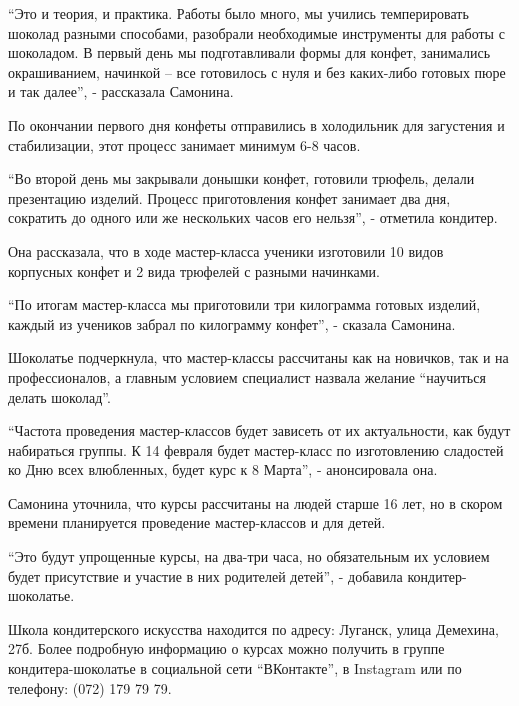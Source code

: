 \enquote{Это и теория, и практика. Работы было много, мы учились темперировать шоколад
разными способами, разобрали необходимые инструменты для работы с шоколадом. В
первый день мы подготавливали формы для конфет, занимались окрашиванием,
начинкой – все готовилось с нуля и без каких-либо готовых пюре и так далее}, -
рассказала Самонина.


По окончании первого дня конфеты отправились в холодильник для загустения и
стабилизации, этот процесс занимает минимум 6-8 часов.

\enquote{Во второй день мы закрывали донышки конфет, готовили трюфель, делали
презентацию изделий. Процесс приготовления конфет занимает два дня, сократить
до одного или же нескольких часов его нельзя}, - отметила кондитер.


Она рассказала, что в ходе мастер-класса ученики изготовили 10 видов корпусных
конфет и 2 вида трюфелей с разными начинками.

\enquote{По итогам мастер-класса мы приготовили три килограмма готовых изделий, каждый
из учеников забрал по килограмму конфет}, - сказала Самонина.

Шоколатье подчеркнула, что мастер-классы рассчитаны как на новичков, так и на
профессионалов, а главным условием специалист назвала желание \enquote{научиться делать
шоколад}.

\enquote{Частота проведения мастер-классов будет зависеть от их актуальности, как будут
набираться группы. К 14 февраля будет мастер-класс по изготовлению сладостей ко
Дню всех влюбленных, будет курс к 8 Марта}, - анонсировала она.

Самонина уточнила, что курсы рассчитаны на людей старше 16 лет, но в скором
времени планируется проведение мастер-классов и для детей.

\enquote{Это будут упрощенные курсы, на два-три часа, но обязательным их условием будет
присутствие и участие в них родителей детей}, - добавила кондитер-шоколатье.

Школа кондитерского искусства находится по адресу: Луганск, улица Демехина,
27б. Более подробную информацию о курсах можно получить в группе
кондитера-шоколатье в социальной сети \enquote{ВКонтакте}, в Instagram или по телефону:
(072) 179 79 79. 
